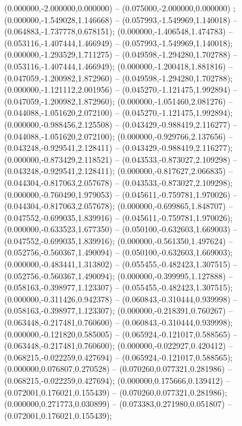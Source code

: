  (0.000000,-2.000000,0.000000) -- (0.075000,-2.000000,0.000000) ;
 (0.000000,-1.549028,1.146668) -- (0.057993,-1.549969,1.140018) -- (0.064883,-1.737778,0.678151);
 (0.000000,-1.406548,1.474783) -- (0.053116,-1.407444,1.466949) -- (0.057993,-1.549969,1.140018);
 (0.000000,-1.293529,1.711275) -- (0.049598,-1.294280,1.702788) -- (0.053116,-1.407444,1.466949);
 (0.000000,-1.200418,1.881816) -- (0.047059,-1.200982,1.872960) -- (0.049598,-1.294280,1.702788);
 (0.000000,-1.121112,2.001956) -- (0.045270,-1.121475,1.992894) -- (0.047059,-1.200982,1.872960);
 (0.000000,-1.051460,2.081276) -- (0.044088,-1.051620,2.072100) -- (0.045270,-1.121475,1.992894);
 (0.000000,-0.988456,2.125508) -- (0.043429,-0.988419,2.116277) -- (0.044088,-1.051620,2.072100);
 (0.000000,-0.929766,2.137656) -- (0.043248,-0.929541,2.128411) -- (0.043429,-0.988419,2.116277);
 (0.000000,-0.873429,2.118521) -- (0.043533,-0.873027,2.109298) -- (0.043248,-0.929541,2.128411);
 (0.000000,-0.817627,2.066835) -- (0.044304,-0.817063,2.057678) -- (0.043533,-0.873027,2.109298);
 (0.000000,-0.760490,1.979053) -- (0.045611,-0.759781,1.970026) -- (0.044304,-0.817063,2.057678);
 (0.000000,-0.699865,1.848707) -- (0.047552,-0.699035,1.839916) -- (0.045611,-0.759781,1.970026);
 (0.000000,-0.633523,1.677350) -- (0.050100,-0.632603,1.669003) -- (0.047552,-0.699035,1.839916);
 (0.000000,-0.561350,1.497624) -- (0.052756,-0.560367,1.490094) -- (0.050100,-0.632603,1.669003);
 (0.000000,-0.483441,1.313802) -- (0.055455,-0.482423,1.307515) -- (0.052756,-0.560367,1.490094);
 (0.000000,-0.399995,1.127888) -- (0.058163,-0.398977,1.123307) -- (0.055455,-0.482423,1.307515);
 (0.000000,-0.311426,0.942378) -- (0.060843,-0.310444,0.939998) -- (0.058163,-0.398977,1.123307);
 (0.000000,-0.218391,0.760267) -- (0.063448,-0.217481,0.760600) -- (0.060843,-0.310444,0.939998);
 (0.000000,-0.121820,0.585005) -- (0.065924,-0.121017,0.588565) -- (0.063448,-0.217481,0.760600);
 (0.000000,-0.022927,0.420412) -- (0.068215,-0.022259,0.427694) -- (0.065924,-0.121017,0.588565);
 (0.000000,0.076807,0.270528) -- (0.070260,0.077321,0.281986) -- (0.068215,-0.022259,0.427694);
 (0.000000,0.175666,0.139412) -- (0.072001,0.176021,0.155439) -- (0.070260,0.077321,0.281986);
 (0.000000,0.271773,0.030899) -- (0.073383,0.271980,0.051807) -- (0.072001,0.176021,0.155439);
